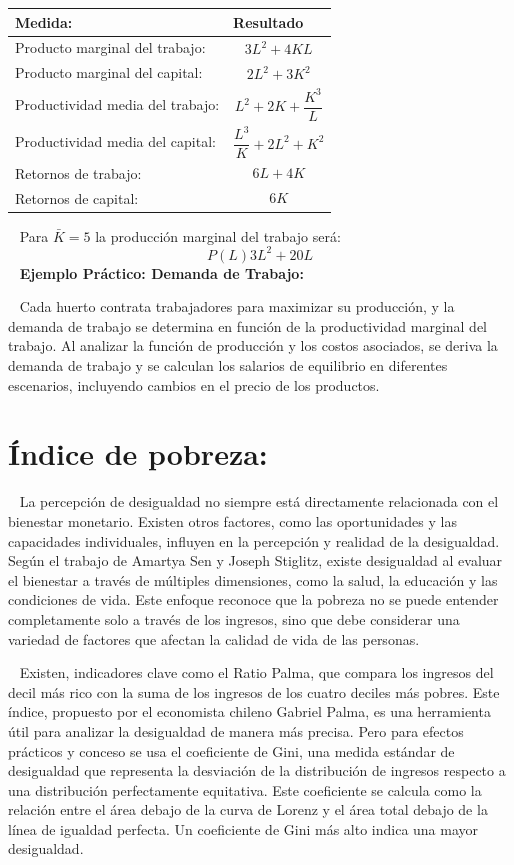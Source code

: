 \documentclass[
  letterpaper,
  DIV=11,
  numbers=noendperiod]{scrreport}
\begin{document}
\begin{table}[h]
    \centering
    \begin{tabular}{|p{40mm}|p{40mm}|}
        \hline
        Medida: & Resultado\\\hline
        Producto marginal del trabajo: & \[3L^2+4KL\] \\\hline
        Producto marginal del capital: & \[2L^2+3K^2\] \\\hline
        Productividad media del trabajo: & \[L^2+2K+\frac{K^3}{L}\] \\\hline
        Productividad media del capital: & \[\frac{L^3}{K}+2L^2+K^2\] \\\hline
        Retornos de trabajo: & \[6L+4K\]  \\\hline
        Retornos de capital: & \[6K\] \\\hline
    \end{tabular}
    
\end{table}

~ Para \(\bar{K}=5\) la producción marginal del trabajo será: \[
P(L)3L^2+20L
\] ~ \textbf{Ejemplo Práctico: Demanda de Trabajo:}

~ Cada huerto contrata trabajadores para maximizar su producción, y la
demanda de trabajo se determina en función de la productividad marginal
del trabajo. Al analizar la función de producción y los costos
asociados, se deriva la demanda de trabajo y se calculan los salarios de
equilibrio en diferentes escenarios, incluyendo cambios en el precio de
los productos.

\hypertarget{uxedndice-de-pobreza}{%
\section{Índice de pobreza:}\label{uxedndice-de-pobreza}}

~ La percepción de desigualdad no siempre está directamente relacionada
con el bienestar monetario. Existen otros factores, como las
oportunidades y las capacidades individuales, influyen en la percepción
y realidad de la desigualdad. Según el trabajo de Amartya Sen y Joseph
Stiglitz, existe desigualdad al evaluar el bienestar a través de
múltiples dimensiones, como la salud, la educación y las condiciones de
vida. Este enfoque reconoce que la pobreza no se puede entender
completamente solo a través de los ingresos, sino que debe considerar
una variedad de factores que afectan la calidad de vida de las personas.

~ Existen, indicadores clave como el Ratio Palma, que compara los
ingresos del decil más rico con la suma de los ingresos de los cuatro
deciles más pobres. Este índice, propuesto por el economista chileno
Gabriel Palma, es una herramienta útil para analizar la desigualdad de
manera más precisa. Pero para efectos prácticos y conceso se usa el
coeficiente de Gini, una medida estándar de desigualdad que representa
la desviación de la distribución de ingresos respecto a una distribución
perfectamente equitativa. Este coeficiente se calcula como la relación
entre el área debajo de la curva de Lorenz y el área total debajo de la
línea de igualdad perfecta. Un coeficiente de Gini más alto indica una
mayor desigualdad.
\end{document}

